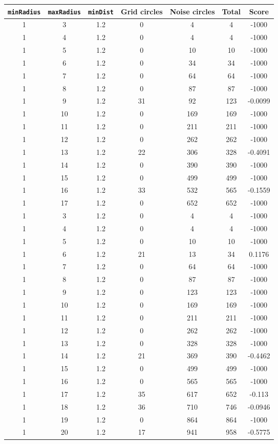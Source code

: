 \documentclass[letterpaper, 12pt]{article}
\begin{document}
\begin{longtable}{|c|c|c|c|c|c|c|}
\hline
\textbf{\texttt{minRadius}} & \textbf{\texttt{maxRadius}} & \textbf{\texttt{minDist}} & \textbf{Grid circles} & \textbf{Noise circles} & \textbf{Total} & \textbf{Score} \\
\hline
1 & 3 & 1.2 & 0 & 4 & 4 & -1000 \\
\hline
1 & 4 & 1.2 & 0 & 4 & 4 & -1000 \\
\hline
1 & 5 & 1.2 & 0 & 10 & 10 & -1000 \\
\hline
1 & 6 & 1.2 & 0 & 34 & 34 & -1000 \\
\hline
1 & 7 & 1.2 & 0 & 64 & 64 & -1000 \\
\hline
1 & 8 & 1.2 & 0 & 87 & 87 & -1000 \\
\hline
1 & 9 & 1.2 & 31 & 92 & 123 & -0.0099 \\
\hline
1 & 10 & 1.2 & 0 & 169 & 169 & -1000 \\
\hline
1 & 11 & 1.2 & 0 & 211 & 211 & -1000 \\
\hline
1 & 12 & 1.2 & 0 & 262 & 262 & -1000 \\
\hline
1 & 13 & 1.2 & 22 & 306 & 328 & -0.4091 \\
\hline
1 & 14 & 1.2 & 0 & 390 & 390 & -1000 \\
\hline
1 & 15 & 1.2 & 0 & 499 & 499 & -1000 \\
\hline
1 & 16 & 1.2 & 33 & 532 & 565 & -0.1559 \\
\hline
1 & 17 & 1.2 & 0 & 652 & 652 & -1000 \\
\hline
1 & 3 & 1.2 & 0 & 4 & 4 & -1000 \\
\hline
1 & 4 & 1.2 & 0 & 4 & 4 & -1000 \\
\hline
1 & 5 & 1.2 & 0 & 10 & 10 & -1000 \\
\hline
1 & 6 & 1.2 & 21 & 13 & 34 & 0.1176 \\
\hline
1 & 7 & 1.2 & 0 & 64 & 64 & -1000 \\
\hline
1 & 8 & 1.2 & 0 & 87 & 87 & -1000 \\
\hline
1 & 9 & 1.2 & 0 & 123 & 123 & -1000 \\
\hline
1 & 10 & 1.2 & 0 & 169 & 169 & -1000 \\
\hline
1 & 11 & 1.2 & 0 & 211 & 211 & -1000 \\
\hline
1 & 12 & 1.2 & 0 & 262 & 262 & -1000 \\
\hline
1 & 13 & 1.2 & 0 & 328 & 328 & -1000 \\
\hline
1 & 14 & 1.2 & 21 & 369 & 390 & -0.4462 \\
\hline
1 & 15 & 1.2 & 0 & 499 & 499 & -1000 \\
\hline
1 & 16 & 1.2 & 0 & 565 & 565 & -1000 \\
\hline
1 & 17 & 1.2 & 35 & 617 & 652 & -0.113 \\
\hline
1 & 18 & 1.2 & 36 & 710 & 746 & -0.0946 \\
\hline
1 & 19 & 1.2 & 0 & 864 & 864 & -1000 \\
\hline
1 & 20 & 1.2 & 17 & 941 & 958 & -0.5775 \\
\hline
\end{longtable}
\end{document}
